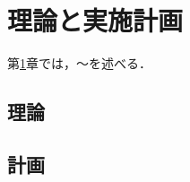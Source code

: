 ﻿%

\chapter{理論と実施計画}\label{chapter:理論と実施計画}
第\ref{chapter:理論と実施計画}章では，～を述べる．

\section{理論}
\section{計画}



